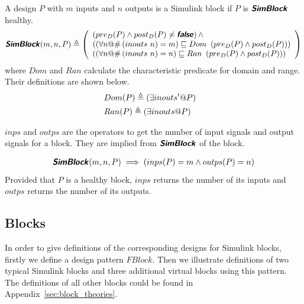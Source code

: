 \begin{definition}
    A design $P$ with $m$ inputs and $n$ outputs is a Simulink block if $P$ is $\hbox{\textbf{\textsf{\textsl{SimBlock}}}}$ healthy.
    \begin{align*}
       \healthy{SimBlock}(m, n, P) \defs \left( 
       \begin{array}[]{l}
       \left(pre_D(P) \land post_D(P) \neq \false\right) \land \\
       \left(\left(\forall n @ \#\left(inouts~n\right) = m\right) \refinedby Dom~\left(pre_D(P) \land post_D(P)\right)\right) \\
       \left(\left(\forall n @ \#\left(inouts~n\right) = n\right) \refinedby Ran~\left(pre_D(P) \land post_D(P)\right)\right)
       \end{array}\right)
    \end{align*}
    where $Dom$ and $Ran$ calculate the characteristic predicate for domain and range. Their definitions are shown below.
    \begin{align*}
       &Dom(P) \triangleq \left(\exists inouts' @ P\right) & \\  
       &Ran(P) \triangleq \left(\exists inouts @ P\right) &
    \end{align*}
\end{definition}

$inps$ and $outps$ are the operators to get the number of input signals and output signals for a block. They are implied from $\hbox{\textbf{\textsf{\textsl{SimBlock}}}}$ of the block. 
\begin{definition}
\begin{align*}
   \hbox{\textbf{\textsf{\textsl{SimBlock}}}}(m, n, P) \implies \left(inps(P) = m \land outps(P) = n\right) 
\end{align*}
    Provided that $P$ is a healthy block, $inps$ returns the number of its inputs and $outps$ returns the number of its outputs.
\end{definition}

\subsection{Blocks}
In order to give definitions of the corresponding designs for Simulink blocks, firstly we define a design pattern $FBlock$. Then we illustrate definitions of two typical Simulink blocks and three additional virtual blocks using this pattern. The definitions of all other blocks could be found in Appendix~\ref{sec:block_theories}.

